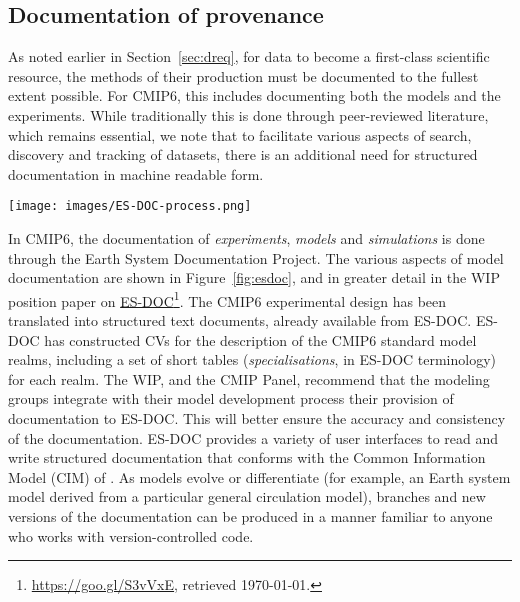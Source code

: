 \documentclass[gmd,manuscript]{copernicus}
\newcommand{\urlref}[2] {\href{#1}{#2}\footnote{\url{#1}, retrieved \today.}}
\begin{document}
\subsection{Documentation of provenance}
\label{sec:doc}

As noted earlier in Section~\ref{sec:dreq}, for data to become a first-class
scientific resource, the methods of their production must be
documented to the fullest extent possible. For CMIP6, this includes
documenting both the models and the experiments. While traditionally
this is done through peer-reviewed literature, which remains
essential, we note that to facilitate various aspects of search,
discovery and tracking of datasets, there is an additional need for
structured documentation in machine readable form.

\begin{figure*}
  \begin{center}
    \texttt{[image: images/ES-DOC-process.png]}
  \end{center}
  \caption{Flowchart of ES-DOC documentation process, delineating
    sequence of events and indicating the parties responsible for
    producing the documentation. Figure courtesy Eric Guilyardi and
    Mark Greenslade.}
  \label{fig:esdoc}
\end{figure*}

In CMIP6, the documentation of \emph{experiments}, \emph{models} and
\emph{simulations} is done through the Earth System Documentation
\citep[\urlref{https://goo.gl/WNwKD9}{ES-DOC},][]{ref:guilyardietal2013}
Project. The various aspects of model documentation are shown in
Figure~\ref{fig:esdoc}, and in greater detail in the WIP position paper on
\urlref{https://goo.gl/S3vVxE}{ES-DOC}. The CMIP6 experimental design
has been translated into structured text documents, already available
from ES-DOC. ES-DOC has constructed CVs for the description of the
CMIP6 standard model realms, including a set of short tables
(\emph{specialisations}, in ES-DOC terminology) for each realm. The
WIP, and the CMIP Panel, recommend that the modeling groups integrate
with their model development process their provision of documentation
to ES-DOC. This will better ensure the accuracy and consistency of the
documentation. ES-DOC provides a variety of user interfaces to read
and write structured documentation that conforms with the Common
Information Model (CIM) of \cite{ref:lawrenceetal2012}. As models evolve
or differentiate (for example, an Earth system model derived from a
particular general circulation model), branches and new versions of
the documentation can be produced in a manner familiar to anyone who
works with version-controlled code.
\end{document}

